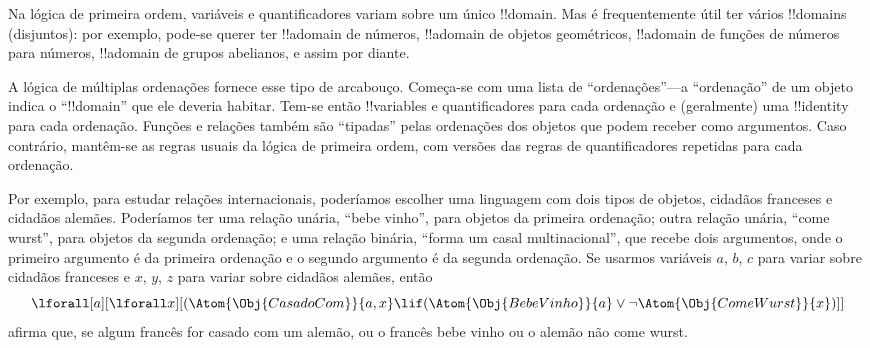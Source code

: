 \documentclass[../../../include/open-logic-section]{subfiles}
\begin{document}


Na lógica de primeira ordem, variáveis e quantificadores variam sobre um único
!!{domain}. Mas é frequentemente útil ter vários !!{domain}s (disjuntos):
por exemplo, pode-se querer ter !!a{domain} de números,
!!a{domain} de objetos geométricos, !!a{domain} de funções de
números para números, !!a{domain} de grupos abelianos, e assim por diante.

A lógica de múltiplas ordenações fornece esse tipo de arcabouço. Começa-se com uma
lista de ``ordenações''---a ``ordenação'' de um objeto indica o
``!!{domain}'' que ele deveria habitar. Tem-se então !!{variable}s
e quantificadores para cada ordenação e (geralmente) uma !!{identity} para cada
ordenação. Funções e relações também são ``tipadas'' pelas ordenações dos
objetos que podem receber como argumentos. Caso contrário, mantêm-se as regras
usuais da lógica de primeira ordem, com versões das regras de quantificadores
repetidas para cada ordenação.

Por exemplo, para estudar relações internacionais, poderíamos escolher uma
linguagem com dois tipos de objetos, cidadãos franceses e cidadãos alemães.
Poderíamos ter uma relação unária, ``bebe vinho'', para objetos
da primeira ordenação; outra relação unária, ``come wurst'', para objetos
da segunda ordenação; e uma relação binária, ``forma um casal
multinacional'', que recebe dois argumentos, onde o primeiro argumento
é da primeira ordenação e o segundo argumento é da segunda ordenação. Se
usarmos variáveis $a$, $b$, $c$ para variar sobre cidadãos franceses e $x$, $y$, $z$
para variar sobre cidadãos alemães, então
\[
\lforall[a][\lforall x][(\Atom{\Obj{CasadoCom}}{a,x} \lif
(\Atom{\Obj{BebeVinho}}{a} \lor \lnot \Atom{\Obj{ComeWurst}}{x})]]
\]
afirma que, se algum francês for casado com um alemão, ou o
francês bebe vinho ou o alemão não come wurst.
\end{document}

